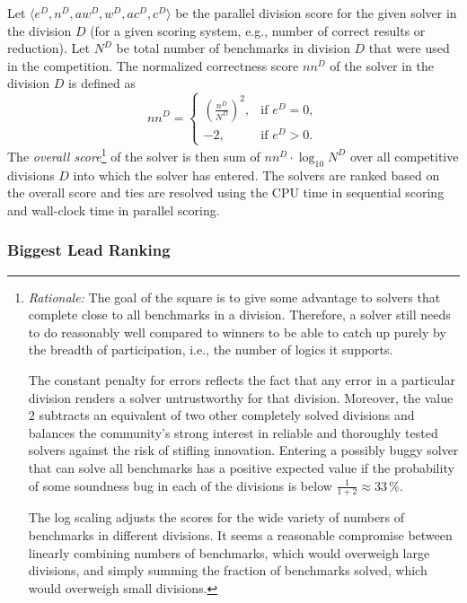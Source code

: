 \documentclass[12pt]{article}
\begin{document}
Let $\langle e^D, n^D, \mathit{aw}^D, w^D, \mathit{ac}^D, c^D \rangle$ be the
parallel division score for the given solver in the division $D$ (for a given
scoring system, e.g., number of correct results or reduction). Let $N^D$ be total
number of benchmarks in division $D$ that were used in the competition. The
normalized correctness score $\mathit{nn}^D$ of the solver in the division $D$
is defined as
\[
  \mathit{nn}^D =
  \begin{cases}
    \left( \frac{n^D}{N^D} \right) ^2, &\text{if }e^D = 0, \\
    -2, &\text{if }e^D > 0.
  \end{cases}
\]
The \emph{overall score}\footnote{\emph{Rationale:} %
  The goal of the square is to give some advantage to solvers
  that complete close to all benchmarks in a division. Therefore, a
  solver still needs to do reasonably well compared to winners to be
  able to catch up purely by the breadth of participation, i.e., the
  number of logics it supports.

  The constant penalty for errors reflects the fact that any error in a
  particular division renders a solver untrustworthy for that division.
  Moreover, the value~$2$ subtracts an equivalent of two other completely solved
  divisions and balances the community's strong interest in reliable and
  thoroughly tested solvers against the risk of stifling innovation. Entering a
  possibly buggy solver that can solve all benchmarks has a positive expected
  value if the probability of some soundness bug in each of the divisions is
  below $\frac{1}{1+2} \approx 33$\,\%.

  The log scaling adjusts the scores for the wide variety of numbers of
  benchmarks in different divisions. It seems a reasonable compromise between
  linearly combining numbers of benchmarks, which would overweigh large
  divisions, and simply summing the fraction of benchmarks solved, which would
  overweigh small divisions.} of the solver is then sum of
$\mathit{nn}^D \cdot \log_{10} N^D$ over all competitive divisions $D$ into
which the solver has entered. The solvers are ranked based on the overall score
and ties are resolved using the CPU time in sequential scoring and wall-clock
time in parallel scoring.

\subsubsection{Biggest Lead Ranking}
\end{document}

